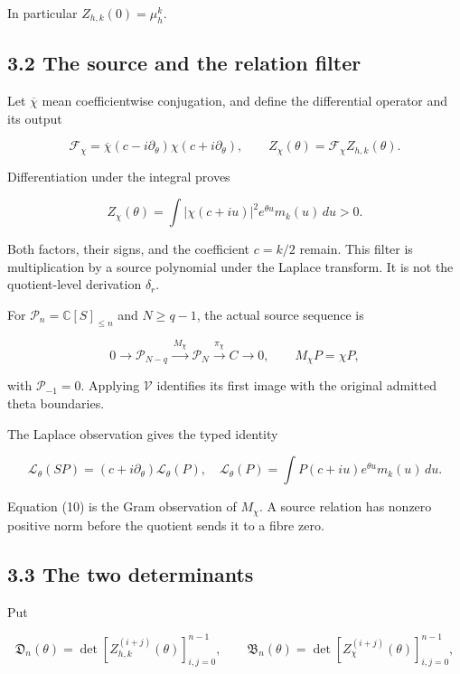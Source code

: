 \documentclass[
  11pt,
]{article}
\begin{document}
In particular \(Z_{h,k}(0)=\mu_h^k\).

\subsection{3.2 The source and the relation
filter}\label{the-source-and-the-relation-filter}

Let \(\overline\chi\) mean coefficientwise conjugation, and define the
differential operator and its output

\[
\mathcal F_\chi
=\overline\chi(c-i\partial_\theta)\chi(c+i\partial_\theta),
\qquad
Z_\chi(\theta)=\mathcal F_\chi Z_{h,k}(\theta).
\tag{9}
\]

Differentiation under the integral proves

\[
\boxed{Z_\chi(\theta)=\int|\chi(c+iu)|^2e^{\theta u}m_k(u)\,du>0.}
\tag{10}
\]

Both factors, their signs, and the coefficient \(c=k/2\) remain. This
filter is multiplication by a source polynomial under the Laplace
transform. It is not the quotient-level derivation \(\delta_r\).

For \(\mathcal P_n=\mathbb C[S]_{\le n}\) and \(N\ge q-1\), the actual
source sequence is

\[
0\longrightarrow\mathcal P_{N-q}
\xrightarrow{\ M_\chi\ }\mathcal P_N
\xrightarrow{\pi_\chi}C\longrightarrow0,
\qquad M_\chi P=\chi P,
\tag{11}
\]

with \(\mathcal P_{-1}=0\). Applying \(\mathcal V\) identifies its first
image with the original admitted theta boundaries.

The Laplace observation gives the typed identity

\[
\mathscr L_\theta(SP)=(c+i\partial_\theta)\mathscr L_\theta(P),
\quad
\mathscr L_\theta(P)=\int P(c+iu)e^{\theta u}m_k(u)\,du.
\]

Equation (10) is the Gram observation of \(M_\chi\). A source relation
has nonzero positive norm before the quotient sends it to a fibre zero.

\subsection{3.3 The two determinants}\label{the-two-determinants}

Put

\[
\mathfrak D_n(\theta)
=\det[Z_{h,k}^{(i+j)}(\theta)]_{i,j=0}^{n-1},
\qquad
\mathfrak B_n(\theta)
=\det[Z_\chi^{(i+j)}(\theta)]_{i,j=0}^{n-1},
\tag{12}
\]
\end{document}
